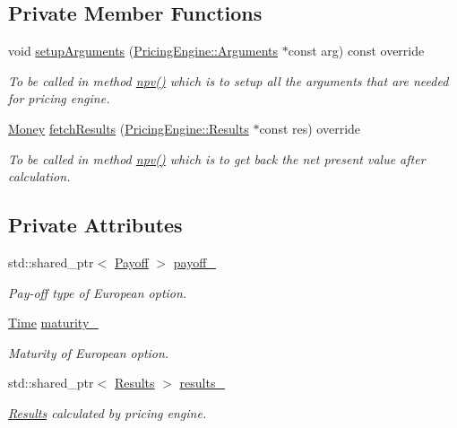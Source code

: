 \subsection*{Private Member Functions}
\begin{DoxyCompactItemize}
\item 
void \hyperlink{class_european_option_a77e3bc17dbcf317561c4920f6bfa84de}{setup\+Arguments} (\hyperlink{class_pricing_engine_1_1_arguments}{Pricing\+Engine\+::\+Arguments} $\ast$const arg) const override
\begin{DoxyCompactList}\small\item\em To be called in method \hyperlink{class_instrument_aa750f2ae95a21d65a073da3171e8d084}{npv()} which is to setup all the arguments that are needed for pricing engine. \end{DoxyCompactList}\item 
\hyperlink{_name_def_8h_a5a9d48c16a694e9a2d9f1eca730dc8c5}{Money} \hyperlink{class_european_option_ae234d562ef21dc24c25f1538860da1cf}{fetch\+Results} (\hyperlink{class_pricing_engine_1_1_results}{Pricing\+Engine\+::\+Results} $\ast$const res) override
\begin{DoxyCompactList}\small\item\em To be called in method \hyperlink{class_instrument_aa750f2ae95a21d65a073da3171e8d084}{npv()} which is to get back the net present value after calculation. \end{DoxyCompactList}\end{DoxyCompactItemize}
\subsection*{Private Attributes}
\begin{DoxyCompactItemize}
\item 
std\+::shared\+\_\+ptr$<$ \hyperlink{class_payoff}{Payoff} $>$ \hyperlink{class_european_option_a3d597cb0b811f69a08e49b1af13b5a04}{payoff\+\_\+}
\begin{DoxyCompactList}\small\item\em Pay-\/off type of European option. \end{DoxyCompactList}\item 
\hyperlink{_name_def_8h_ac2d3e0ba793497bcca555c7c2cf64ff3}{Time} \hyperlink{class_european_option_a8853b9bd1af9abc371630ae1c68f304c}{maturity\+\_\+}
\begin{DoxyCompactList}\small\item\em Maturity of European option. \end{DoxyCompactList}\item 
std\+::shared\+\_\+ptr$<$ \hyperlink{class_european_option_1_1_results}{Results} $>$ \hyperlink{class_european_option_a228f13a5ce4c46caef1e3052b4a27610}{results\+\_\+}
\begin{DoxyCompactList}\small\item\em \hyperlink{class_european_option_1_1_results}{Results} calculated by pricing engine. \end{DoxyCompactList}\end{DoxyCompactItemize}
